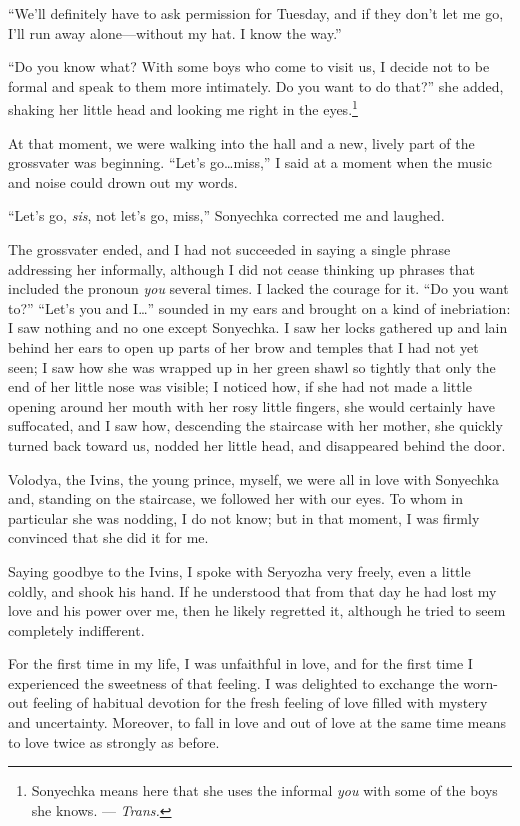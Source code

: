 ``We'll definitely have to ask permission for Tuesday, and if they don't let me go, I'll run away alone---without my hat. I know the way.'' %

``Do you know what? With some boys who come to visit us, I decide not to be formal and speak to them more intimately. Do you want to do that?'' she added, shaking her little head and looking me right in the eyes.\footnote{Sonyechka means here that she uses the informal \textit{you} with some of the boys she knows. --- \textit{Trans.}} %

At that moment, we were walking into the hall and a new, lively part of the grossvater was beginning. ``Let's go\ldots{}miss,'' I said at a moment when the music and noise could drown out my words.

``Let's go, \emph{sis}, not let's go, miss,'' Sonyechka corrected me and laughed. %

The grossvater ended, and I had not succeeded in saying a single phrase addressing her informally, although I did not cease thinking up phrases that included the pronoun \textit{you} several times. I lacked the courage for it. ``Do you want to?'' ``Let's you and I\ldots{}'' sounded in my ears and brought on a kind of inebriation: I saw nothing and no one except Sonyechka. I saw her locks gathered up and lain behind her ears to open up parts of her brow and temples that I had not yet seen; I saw how she was wrapped up in her green shawl so tightly that only the end of her little nose was visible; I noticed how, if she had not made a little opening around her mouth with her rosy little fingers, she would certainly have suffocated, and I saw how, descending the staircase with her mother, she quickly turned back toward us, nodded her little head, and disappeared behind the door.

Volodya, the Ivins, the young prince, myself, we were all in love with Sonyechka and, standing on the staircase, we followed her with our eyes. To whom in particular she was nodding, I do not know; but in that moment, I was firmly convinced that she did it for me.

Saying goodbye to the Ivins, I spoke with Seryozha very freely, even a little coldly, and shook his hand. If he understood that from that day he had lost my love and his power over me, then he likely regretted it, although he tried to seem completely indifferent.

For the first time in my life, I was unfaithful in love, and for the first time I experienced the sweetness of that feeling. I was delighted to exchange the worn-out feeling of habitual devotion for the fresh feeling of love filled with mystery and uncertainty. Moreover, to fall in love and out of love at the same time means to love twice as strongly as before.


